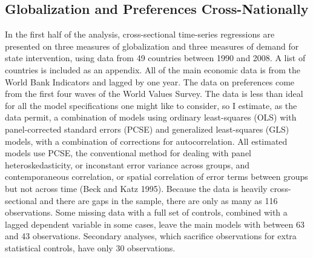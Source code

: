\documentclass[12pt]{report}
\begin{document}
\subsection{Globalization and Preferences Cross-Nationally}
In the first half of the analysis, cross-sectional time-series regressions are presented on three measures of globalization and three measures of demand for state intervention, using data from 49 countries between 1990 and 2008. A list of countries is included as an appendix. All of the main economic data is from the World Bank
Indicators and lagged by one year.  The data on preferences come from the first four waves of the
World Values Survey. The data is less than ideal for all the model specifications one might like to
consider, so I estimate, as the data permit, a combination of models using ordinary least-squares
(OLS) with panel-corrected standard errors (PCSE) and generalized least-squares (GLS) models, with a
combination of corrections for autocorrelation. All estimated models use PCSE, the conventional
method for dealing with panel heteroskedasticity, or inconstant error variance across groups, and
contemporaneous correlation, or spatial correlation of error terms between groups but not across
time (Beck and Katz 1995). Because the data is heavily cross-sectional and there are gaps in the
sample, there are only as many as 116 observations. Some missing data with a full set of controls,
combined with a lagged dependent variable in some cases, leave the main models with between 63 and
43 observations. Secondary analyses, which sacrifice observations for extra statistical controls,
have only 30 observations.
	
\end{document}
